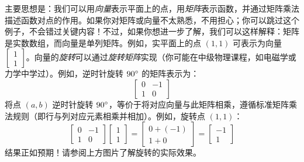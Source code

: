 \begin{example}
\begin{multicols}{2}
        \begin{center}
            {}
        \end{center}
    \end{multicols}

    主要思想是：我们可以用\emph{向量}表示平面上的点，用\emph{矩阵}表示函数，并通过矩阵乘法描述函数对点的作用。如果你对矩阵或向量不太熟悉，不用担心；你可以跳过这个例子，不会错过关键内容！不过，如果你想进一步了解，我们可以这样解释：矩阵是实数数组，而向量是单列矩阵。例如，实平面上的点 $(1, 1)$ 可表示为向量 $\begin{bmatrix}
        1 \\
        1
     \end{bmatrix}$。向量的\emph{旋转}可以通过\emph{旋转矩阵}实现（你可能在中级物理课程，如电磁学或力学中学过）。例如，逆时针旋转 $90 ^\circ$ 的矩阵表示为：
     \[\begin{bmatrix}
        0 & -1 \\
        1 & 0
     \end{bmatrix}\]
     将点 $(a, b)$ 逆时针旋转 $90 ^\circ$，等价于将对应向量与此矩阵相乘，遵循标准矩阵乘法规则（即行与列对应元素相乘并相加）。例如，旋转点 $(1, 1)$：
     \[\begin{bmatrix}
        0 & -1 \\
        1 & 0
     \end{bmatrix}\begin{bmatrix}
        1 \\
        1
     \end{bmatrix} = \begin{bmatrix}
        0+(-1) \\
        1+0
     \end{bmatrix}=\begin{bmatrix}
        -1 \\
        1
     \end{bmatrix}\]
     结果正如预期！请参阅上方图片了解旋转的实际效果。


\end{example}

